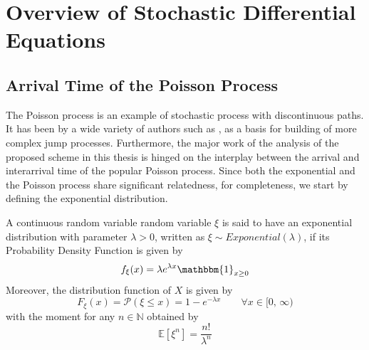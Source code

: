 \chapter{Overview of Stochastic Differential Equations}

\section{Arrival Time of the Poisson Process}
The Poisson process is an example of stochastic process with discontinuous paths. It has been  by a wide variety of authors such as , as a basis for building of more complex jump processes. Furthermore, the major work of the analysis of the proposed scheme  in this thesis is hinged on the interplay between the arrival and interarrival time of the popular Poisson process. Since both the exponential and the Poisson process share significant relatedness, for completeness, we start by defining the exponential distribution.
\begin{definition} A continuous random variable random variable $\xi$ is said to have an exponential distribution with parameter $\lambda > 0$, written as $\xi \sim Exponential(\lambda)$, if its Probability Density Function is given by 
\begin{equation}
    f_\xi(x) = \lambda e^{\lambda x}\mathbbm{1}_{x\geq 0}
\end{equation}
Moreover, the distribution function of $X$ is given by 
\begin{equation}
    F_\xi(x) = \mathcal{P}(\xi \leq x) = 1 - e^{-\lambda x} \qquad \forall x \in [0, \, \infty)
\end{equation}
with the moment for any $n \in \mathbb{N}$ obtained by 
\begin{equation*}
    \mathbb{E}[\xi^n] = \dfrac{n!}{\lambda^n}
\end{equation*}
\end{definition}
